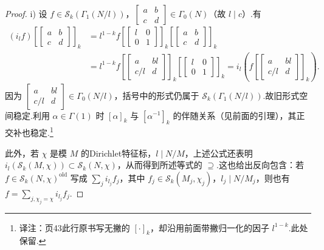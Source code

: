 \begin{proof}

i) 设 $f\in\mathcal S_k(\Gamma_1(N/l))$，$\left[\begin{smallmatrix}a&b\\c&d\end{smallmatrix}\right]\in\Gamma_0(N)$（故 $l\mid c$）.有
\begin{align*}
(i_lf)[\left[\begin{smallmatrix}a&b\\c&d\end{smallmatrix}\right]]_k
&=l^{1-k}f[\left[\begin{smallmatrix}l&0\\0&1\end{smallmatrix}\right]]_k[\left[\begin{smallmatrix}a&b\\c&d\end{smallmatrix}\right]]_k\\
&=l^{1-k}f[\left[\begin{smallmatrix}a&bl\\c/l&d\end{smallmatrix}\right]]_k[\left[\begin{smallmatrix}l&0\\0&1\end{smallmatrix}\right]]_k
=i_l(f[\left[\begin{smallmatrix}a&bl\\c/l&d\end{smallmatrix}\right]]_k).
\end{align*}
因为 $\left[\begin{smallmatrix}a&bl\\c/l&d\end{smallmatrix}\right]\in\Gamma_0(N/l)$，括号中的形式仍属于 $\mathcal S_k(\Gamma_1(N/l))$.故旧形式空间稳定.利用 $\alpha\in\Gamma(1)$ 时 $[\alpha]_k$ 与 $[\alpha^{-1}]_k$ 的伴随关系（见前面的引理），其正交补也稳定.\footnote{译注：页43此行原书写无撇的 $[\cdot]_k$，却沿用前面带撇归一化的因子 $l^{1-k}$.此处保留.}

此外，若 $\chi$ 是模 $M$ 的Dirichlet特征标，$l\mid N/M$，上述公式还表明 $i_l(\mathcal S_k(M,\chi))\subset\mathcal S_k(N,\chi)$，从而得到所述等式的 $\supseteq$.这也给出反向包含：若 $f\in\mathcal S_k(N,\chi)^{\mathrm{old}}$ 写成 $\sum_j i_{l_j}f_j$，其中 $f_j\in\mathcal S_k(M_j,\chi_j)$，$l_j\mid N/M_j$，则也有 $f=\sum_{j,\chi_j=\chi}i_{l_j}f_j$.


\end{proof}

